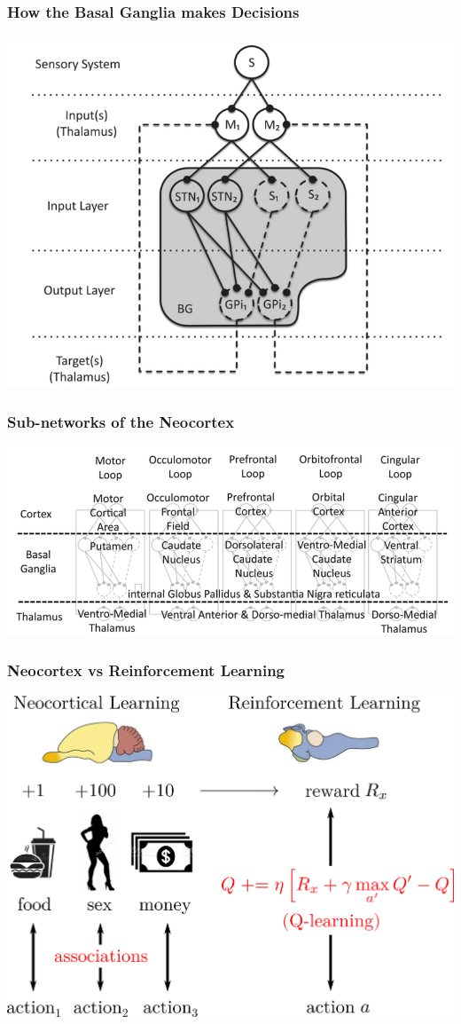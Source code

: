 \documentclass[16pt]{beamer}
\begin{document}
\begin{frame}
\frametitle{How the Basal Ganglia makes Decisions}
\centering
\includegraphics[scale=0.4]{diencephalic-loop.png}
\end{frame}

\begin{frame}
\frametitle{Sub-networks of the Neocortex}
\centering
\includegraphics[scale=0.4]{telencephalic-loop.png}
\end{frame}

\begin{frame}
\frametitle{Neocortex vs Reinforcement Learning}
\centering
\includegraphics[scale=0.5]{neocortex-vs-RL.png}
\end{frame}
\end{document}
